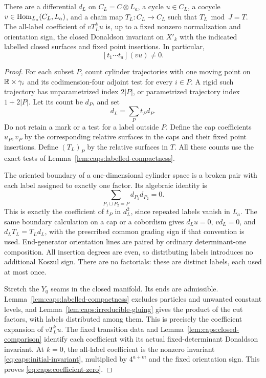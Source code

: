 \begin{proposition}\label{prop:caps:labelled}
There are a differential $d_L$ on $C_L=C\otimes L_a$, a cycle
$u\in C_L$, a cocycle $v\in\operatorname{Hom}_{L_a}(C_L,L_a)$, and a chain map
$T_L:C_L\to C_L$ such that $T_L\bmod J=T$.  The all-label coefficient
of $vT_L^k u$ is, up to a fixed nonzero normalization and orientation
sign, the closed Donaldson invariant on $X'_k$ with the indicated
labelled closed surfaces and fixed point insertions.  In particular,
\begin{equation}\label{eq:caps:coefficient-zero}
                    [t_1\cdots t_a](vu)\ne0.
\end{equation}
\end{proposition}

\begin{proof}
For each subset $P$, count cylinder trajectories with one moving point
on $\mathbb R\times\gamma_i$ and its codimension-four adjoint test for every
$i\in P$.  A rigid such trajectory has unparametrized index
$2|P|$, or parametrized trajectory index $1+2|P|$.
Let its count be $d_P$, and set
\[
                         d_L=\sum_Pt_Pd_P.
\]
Do not retain a mark or a test for a label outside $P$.  Define the cap
coefficients $u_P,v_P$ by the corresponding relative surfaces in the
caps and their fixed point insertions.  Define $(T_L)_P$ by the
relative surfaces in $T$.  All these counts use the exact tests of
Lemma~\ref{lem:caps:labelled-compactness}.

The oriented boundary of a one-dimensional cylinder space is a broken
pair with each label assigned to exactly one factor.  Its algebraic
identity is
\[
              \sum_{P_1\sqcup P_2=P}d_{P_1}d_{P_2}=0.
\]
This is exactly the coefficient of $t_P$ in $d_L^2$, since repeated
labels vanish in $L_a$.  The same boundary calculation on a cap or a
cobordism gives $d_Lu=0$, $vd_L=0$, and
$d_LT_L=T_Ld_L$, with the prescribed common grading sign if that
convention is used.  End-generator orientation lines are paired by
ordinary determinant-one composition.  All insertion degrees are even,
so distributing labels introduces no additional Koszul sign.  There
are no factorials: these are distinct labels, each used at most once.

Stretch the $Y_0$ seams in the closed manifold.  Its ends are admissible.
Lemma~\ref{lem:caps:labelled-compactness} excludes particles and unwanted
constant levels, and Lemma~\ref{lem:caps:irreducible-gluing} gives the product of the
cut factors, with labels distributed among them.  This is precisely
the coefficient expansion of $vT_L^ku$.  The fixed transition data and
Lemma~\ref{lem:caps:closed-comparison} identify each coefficient with
its actual fixed-determinant Donaldson invariant.  At $k=0$, the
all-label coefficient is the nonzero invariant
\eqref{eq:caps:initial-invariant}, multiplied by $4^{a+m}$ and the
fixed orientation sign.  This proves \eqref{eq:caps:coefficient-zero}.
\end{proof}

